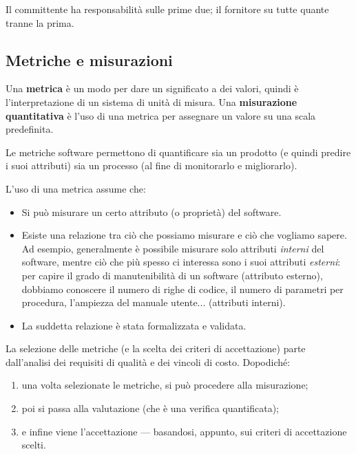 \documentclass[a4paper]{article}
\begin{document}
		
Il committente ha responsabilità sulle prime due; il fornitore su tutte quante tranne la prima.

		
	\subsection{Metriche e misurazioni}

		
Una \textbf{metrica} è un modo per dare un significato a dei valori, quindi è l'interpretazione di un sistema di unità di misura. Una \textbf{misurazione quantitativa} è l'uso di una metrica per assegnare un valore su una scala predefinita.
		
Le metriche software permettono di quantificare sia un prodotto (e quindi predire i suoi attributi) sia un processo (al fine di monitorarlo e migliorarlo).
		
L'uso di una metrica assume che:
		
	\begin{itemize}
		
			
	\item Si può misurare un certo attributo (o proprietà) del software.
			
	\item Esiste una relazione tra ciò che possiamo misurare e ciò che vogliamo sapere. Ad esempio, generalmente è possibile misurare solo attributi \emph{interni} del software, mentre ciò che più spesso ci interessa sono i suoi attributi \emph{esterni}: per capire il grado di manutenibilità di un software (attributo esterno), dobbiamo conoscere il numero di righe di codice, il numero di parametri per procedura, l'ampiezza del manuale utente... (attributi interni).
			
	\item La suddetta relazione è stata formalizzata e validata.
		
	\end{itemize}

		
La selezione delle metriche (e la scelta dei criteri di accettazione) parte dall'analisi dei requisiti di qualità e dei vincoli di costo. Dopodiché:
		
	\begin{enumerate}
		
			
	\item una volta selezionate le metriche, si può procedere alla misurazione;
			
	\item poi si passa alla valutazione (che è una verifica quantificata);
			
	\item e infine viene l'accettazione --- basandosi, appunto, sui criteri di accettazione scelti.
		
	\end{enumerate}
\end{document}
